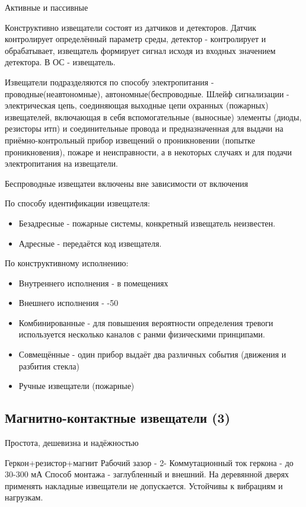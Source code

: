 \documentclass[a4paper,12pt]{report}
\begin{document}
	Активные и пассивные

	Конструктивно извещатели состоят из датчиков и детекторов. Датчик контролирует определённый параметр среды, детектор - контролирует и обрабатывает, извещатель формирует сигнал исходя из входных значением детектора. В ОС - извещатель.

	Извещатели подразделяются по способу электропитания - проводные(неавтономные), автономные(беспроводные.
	Шлейф сигнализации - электрическая цепь, соединяющая выходные цепи охранных (пожарных) извещателей, включающая в себя вспомогательные (выносные) элементы (диоды, резисторы итп) и соединительные провода и предназначенная для выдачи на приёмно-контрольный прибор извещений о проникновении (попытке проникновения), пожаре и неисправности, а в некоторых случаях и для подачи электропитания на извещатели.

	Беспроводные извещатеи включены вне зависимости от включения


	По способу идентификации извещателя:
	\begin{itemize}
	\item	Безадресные - пожарные системы, конкретный извещатель неизвестен.
	\item	Адресные - передаётся код извещателя.
	\end{itemize}

	По конструктивному исполнению:
	\begin{itemize}
	\item	Внутреннего исполнения - в помещениях
	\item	Внешнего исполнения - -50%
	\end{itemize}

	\begin{itemize}
	\item	Комбинированные - для повышения вероятности определения тревоги используется несколько каналов с ранми физическими принципами.
	\item	Совмещённые - один прибор выдаёт два различных события (движения и разбития стекла)
	\item	Ручные извещатели (пожарные)
	\end{itemize}

	\subsection{Магнитно-контактные извещатели (3)}
	Простота, дешевизна и надёжностью

	Геркон+резистор+магнит
	Рабочий зазор - 2-
	Коммутационный ток геркона - до 30-300 мА
	Способ монтажа - заглубленный и внешний. На деревянной дверях применять накладные извещатели не допускается.
	Устойчивы к вибрациям и нагрузкам.
\end{document}
